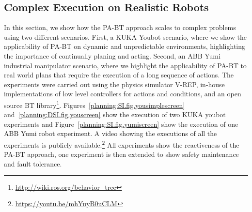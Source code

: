 \newpage

\subsection{Complex Execution on Realistic Robots}
\label{planning:sec:simulations}

In this section, we show how the PA-BT approach scales to complex problems using two different scenarios. First, a KUKA Youbot scenario, where we show the applicability of PA-BT on dynamic and unpredictable environments, highlighting the importance of continually planing and acting. Second, an  ABB Yumi industrial manipulator scenario, where we highlight the applicability of PA-BT to real world plans that require the execution of a long sequence of actions. The experiments were carried out using the physics simulator V-REP, in-house implementations of low level controllers for actions and conditions, and an open source BT library\footnote{\url{http://wiki.ros.org/behavior_tree}}.  
 Figures~\ref{planning:SI.fig.yousimplescreen} and~\ref{planning:DSI.fig.youscreen} show the execution of two KUKA youbot experiments and Figure~\ref{planning:SI.fig.yumiscreen} show the execution of one ABB Yumi robot experiment. A video showing the executions of all the experiments is publicly available.\footnote{\url{https://youtu.be/mhYuyB0uCLM}} {All experiments show the reactiveness of the PA-BT approach, one experiment is then extended to show safety maintenance and fault tolerance.}




%
%
% 
%
